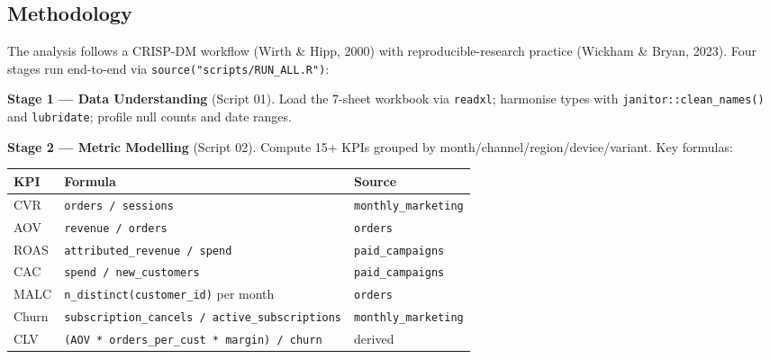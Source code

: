 \documentclass[
  11pt,
]{article}
\begin{document}
\subsection{Methodology}\label{methodology}

The analysis follows a CRISP-DM workflow (Wirth \& Hipp, 2000) with
reproducible-research practice (Wickham \& Bryan, 2023). Four stages run
end-to-end via \texttt{source("scripts/RUN\_ALL.R")}:

\textbf{Stage 1 --- Data Understanding} (Script 01). Load the 7-sheet
workbook via \texttt{readxl}; harmonise types with
\texttt{janitor::clean\_names()} and \texttt{lubridate}; profile null
counts and date ranges.

\textbf{Stage 2 --- Metric Modelling} (Script 02). Compute 15+ KPIs
grouped by month/channel/region/device/variant. Key formulas:

\begin{longtable}[]{@{}
  >{\raggedright\arraybackslash}p{}
  >{\raggedright\arraybackslash}p{}
  >{\raggedright\arraybackslash}p{}@{}}
\toprule\noalign{}
\begin{minipage}[b]{\linewidth}\raggedright
KPI
\end{minipage} & \begin{minipage}[b]{\linewidth}\raggedright
Formula
\end{minipage} & \begin{minipage}[b]{\linewidth}\raggedright
Source
\end{minipage} \\
\midrule\noalign{}
\endhead
\bottomrule\noalign{}
\endlastfoot
CVR & \texttt{orders\ /\ sessions} & \texttt{monthly\_marketing} \\
AOV & \texttt{revenue\ /\ orders} & \texttt{orders} \\
ROAS & \texttt{attributed\_revenue\ /\ spend} &
\texttt{paid\_campaigns} \\
CAC & \texttt{spend\ /\ new\_customers} & \texttt{paid\_campaigns} \\
MALC & \texttt{n\_distinct(customer\_id)} per month & \texttt{orders} \\
Churn & \texttt{subscription\_cancels\ /\ active\_subscriptions} &
\texttt{monthly\_marketing} \\
CLV & \texttt{(AOV\ *\ orders\_per\_cust\ *\ margin)\ /\ churn} &
derived \\
\end{longtable}
\end{document}
